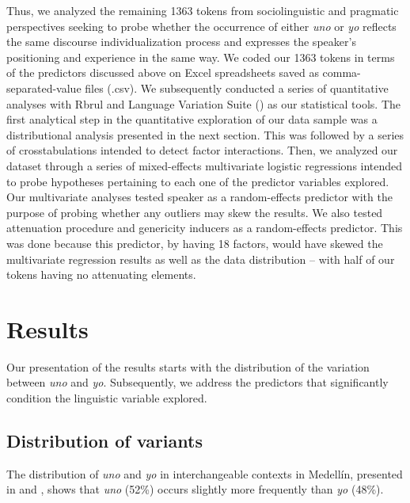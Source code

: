 \documentclass[output=paper]{langscibook}
\begin{document}
Thus, we analyzed the remaining 1363 tokens from sociolinguistic and pragmatic perspectives seeking to probe whether the occurrence of either \textit{uno} or \textit{yo} reflects the same discourse individualization process and expresses the speaker’s positioning and experience in the same way. We coded our 1363 tokens in terms of the predictors discussed above on Excel spreadsheets saved as comma-sep\-a\-rat\-ed-value files (.csv). We subsequently conducted a series of quantitative analyses with Rbrul and Language Variation Suite (\citealt{ScrivnerDíaz-Campos2016}) as our statistical tools. The first analytical step in the quantitative exploration of our data sample was a distributional analysis \parencites[193]{Tagliamonte2006}[121]{Tagliamonte2012} presented in the next section. This was followed by a series of crosstabulations intended to detect factor interactions. Then, we analyzed our dataset through a series of mixed-effects multivariate logistic regressions intended to probe hypotheses pertaining to each one of the predictor variables explored. Our multivariate analyses tested speaker as a random-effects predictor with the purpose of probing whether any outliers may skew the results. We also tested attenuation procedure and genericity inducers as a random-effects predictor. This was done because this predictor, by having 18 factors, would have skewed the multivariate regression results as well as the data distribution – with half of our tokens having no attenuating elements.


\section{Results}\label{sec:orozco:4}


Our presentation of the results starts with the distribution of the variation between \textit{uno} and \textit{yo}. Subsequently, we address the predictors that significantly condition the linguistic variable explored. 



\subsection{Distribution of variants}\label{sec:orozco:4.1} 



The distribution of \textit{uno} and \textit{yo} in interchangeable contexts in Medellín, presented in  and , shows that \textit{uno} (52\%) occurs slightly more frequently than \textit{yo} (48\%). 
\end{document}
